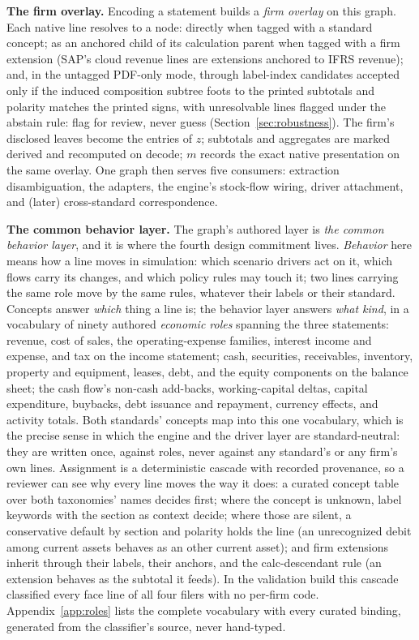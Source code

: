 \documentclass[11pt]{article}
\newcommand{\lead}[2]{\par\addvspace{5pt}\textbf{\textcolor{#1}{#2}}}
\begin{document}
\lead{navytwo}{The firm overlay.} Encoding a statement builds a \emph{firm overlay} on this graph. Each native line resolves to a node: directly when tagged with a standard concept; as an anchored child of its calculation parent when tagged with a firm extension (SAP's cloud revenue lines are extensions anchored to IFRS revenue); and, in the untagged PDF-only mode, through label-index candidates accepted only if the induced composition subtree foots to the printed subtotals and polarity matches the printed signs, with unresolvable lines flagged under the abstain rule: flag for review, never guess (Section~\ref{sec:robustness}). The firm's disclosed leaves become the entries of $z$; subtotals and aggregates are marked derived and recomputed on decode; $m$ records the exact native presentation on the same overlay. One graph then serves five consumers: extraction disambiguation, the adapters, the engine's stock-flow wiring, driver attachment, and (later) cross-standard correspondence.

\lead{navytwo}{The common behavior layer.} The graph's authored layer is \emph{the common behavior layer}, and it is where the fourth design commitment lives. \emph{Behavior} here means how a line moves in simulation: which scenario drivers act on it, which flows carry its changes, and which policy rules may touch it; two lines carrying the same role move by the same rules, whatever their labels or their standard. Concepts answer \emph{which} thing a line is; the behavior layer answers \emph{what kind}, in a vocabulary of ninety authored \emph{economic roles} spanning the three statements: revenue, cost of sales, the operating-expense families, interest income and expense, and tax on the income statement; cash, securities, receivables, inventory, property and equipment, leases, debt, and the equity components on the balance sheet; the cash flow's non-cash add-backs, working-capital deltas, capital expenditure, buybacks, debt issuance and repayment, currency effects, and activity totals. Both standards' concepts map into this one vocabulary, which is the precise sense in which the engine and the driver layer are standard-neutral: they are written once, against roles, never against any standard's or any firm's own lines. Assignment is a deterministic cascade with recorded provenance, so a reviewer can see why every line moves the way it does: a curated concept table over both taxonomies' names decides first; where the concept is unknown, label keywords with the section as context decide; where those are silent, a conservative default by section and polarity holds the line (an unrecognized debit among current assets behaves as an other current asset); and firm extensions inherit through their labels, their anchors, and the calc-descendant rule (an extension behaves as the subtotal it feeds). In the validation build this cascade classified every face line of all four filers with no per-firm code. Appendix~\ref{app:roles} lists the complete vocabulary with every curated binding, generated from the classifier's source, never hand-typed.
\end{document}
